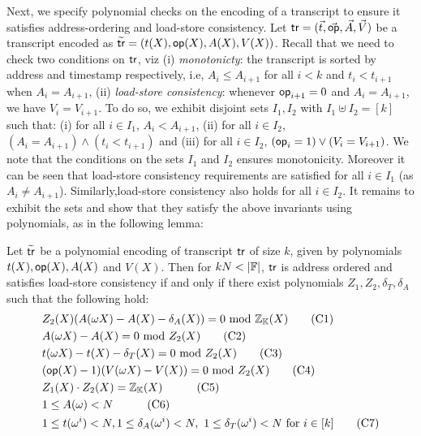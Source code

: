 Next, we specify polynomial checks on the encoding of a transcript to ensure it satisfies address-ordering and load-store consistency.
Let $\mathsf{tr}=(\vec{t},\vec{\mathsf{op}},\vec{A},\vec{V})$ be a transcript encoded as
$\widetilde{\mathsf{tr}}=(t(X),\mathsf{op}(X),A(X),V(X))$. Recall that we need to check two conditions on $\mathsf{tr}$, viz (i) {\em monotonicty}:
the transcript is sorted by address and timestamp respectively, i.e, $A_i\leq A_{i+1}$ for all $i < k$ and
$t_i < t_{i+1}$ when $A_i=A_{i+1}$, (ii) {\em load-store consistency}: whenever $\mathsf{op}_{i+1}=0$ and $A_i=A_{i+1}$,
we have $V_i=V_{i+1}$. To do so, we exhibit disjoint sets $I_1,I_2$ with $I_1\uplus I_2=[k]$ such that: (i) for all
$i\in I_1$, $A_i < A_{i+1}$, (ii) for all $i\in I_2$, $(A_i = A_{i+1})\wedge (t_i < t_{i+1})$ and (iii) for all $i\in I_2$,
$(\mathsf{op}_i=1)\vee (V_i = V_{i+1})$. We note that the conditions on the sets $I_1$ and $I_2$ ensures monotonicity.
Moreover it can be seen that load-store consistency requirements are satisfied for all $i\in I_1$ (as $A_i\neq A_{i+1}$).
Similarly,load-store consistency also holds for all $i\in I_2$.
It remains to exhibit the sets and show that they satisfy the above invariants using polynomials, as in the following
lemma:
\begin{lemma}\label{lem:addr-ordered-transcript}
Let $\widetilde{\mathsf{tr}}$ be a polynomial encoding of transcript $\mathsf{tr}$ of size $k$, given by polynomials $t(X),\mathsf{op}(X),A(X)$ and $V(X)$.
Then for $kN<|\F|$, $\mathsf{tr}$ is address ordered and satisfies load-store consistency if and only if there exist polynomials
$Z_1,Z_2,\delta_T,\delta_A$
such that the following hold:
    {\small
\begin{align}%
    & Z_2(X)(A(\omega X) - A(X) - \delta_A(X)) = 0 \text{ mod } \mathbb{Z}_\setH(X) \tag{C1} \label{eq:C1} \\
    & A(\omega X) - A(X) = 0  \text{ mod } Z_2(X) \tag{C2} \label{eq:C2} \\
    & t(\omega X) - t(X) - \delta_T(X) = 0  \text{ mod } Z_2(X) \tag{C3} \label{eq:C3} \\
    & (\op(X) - 1)(V(\omega X) - V(X)) = 0  \text{ mod } Z_2(X) \tag{C4} \label{eq:C4} \\
    & Z_1(X)\cdot Z_2(X) = \mathbb{Z}_\setH(X) \quad  \tag{C5} \label{eq:C5} \\
    & 1\leq A(\omega) < N  \quad \tag{C6} \label{eq:C6} \\
    & 1\leq t(\omega^i) < N, 1\leq \delta_A(\omega^i)<N,\ 1\leq \delta_T(\omega^i)<N \text{ for } i\in [k] \tag{C7} \label{eq:C7}
\end{align}
}
\end{lemma}

